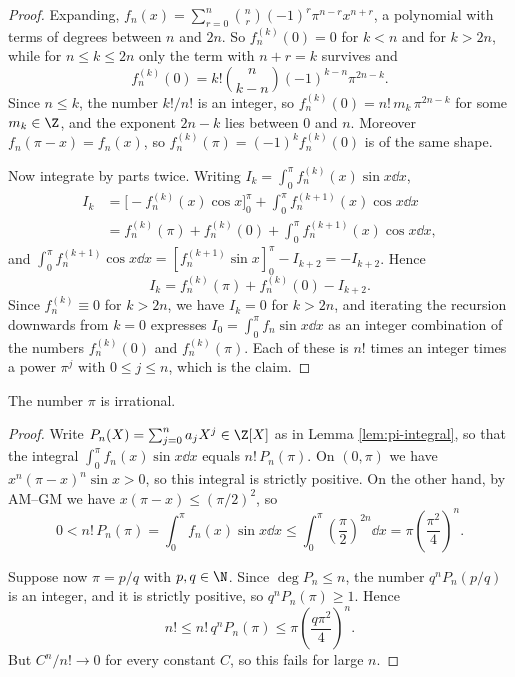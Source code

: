 \begin{proof}
	Expanding, $f_n(x) = \sum_{r=0}^n\binom{n}{r}(-1)^r\pi^{n-r}x^{n+r}$, a polynomial with terms of degrees between $n$ and $2n$. So $f_n^{(k)}(0) = 0$ for $k<n$ and for $k>2n$, while for $n\leq k\leq 2n$ only the term with $n+r = k$ survives and
	$$f_n^{(k)}(0) = k!\binom{n}{k-n}(-1)^{k-n}\pi^{2n-k}.$$
	Since $n\leq k$, the number $k!/n!$ is an integer, so $f_n^{(k)}(0) = n!\,m_k\,\pi^{2n-k}$ for some $m_k \in \Z$, and the exponent $2n-k$ lies between $0$ and $n$. Moreover $f_n(\pi-x) = f_n(x)$, so $f_n^{(k)}(\pi) = (-1)^kf_n^{(k)}(0)$ is of the same shape.

	Now integrate by parts twice. Writing $I_k = \int_0^\pi f_n^{(k)}(x)\sin x\dd x$,
	\begin{align*}
		I_k &= \Big[-f_n^{(k)}(x)\cos x\Big]_0^\pi + \int_0^\pi f_n^{(k+1)}(x)\cos x \dd x \\
		&= f_n^{(k)}(\pi)+f_n^{(k)}(0) + \int_0^\pi f_n^{(k+1)}(x)\cos x\dd x,
	\end{align*}
	and $\int_0^\pi f_n^{(k+1)}\cos x\dd x = \left[f_n^{(k+1)}\sin x\right]_0^\pi - I_{k+2} = -I_{k+2}$. Hence
	$$I_k = f_n^{(k)}(\pi)+f_n^{(k)}(0) - I_{k+2}.$$
	Since $f_n^{(k)}\equiv0$ for $k>2n$, we have $I_k = 0$ for $k>2n$, and iterating the recursion downwards from $k=0$ expresses $I_0 = \int_0^\pi f_n\sin x\dd x$ as an integer combination of the numbers $f_n^{(k)}(0)$ and $f_n^{(k)}(\pi)$. Each of these is $n!$ times an integer times a power $\pi^j$ with $0\leq j\leq n$, which is the claim.
\end{proof}

\begin{theorem}\label{thm:pi-irrational}
	The number $\pi$ is irrational.
\end{theorem}

\begin{proof}
	Write $P_n(X) = \sum_{j=0}^na_jX^j\in\Z[X]$ as in Lemma \ref{lem:pi-integral}, so that the integral $\int_0^\pi f_n(x)\sin x\dd x$ equals $n!\,P_n(\pi)$. On $(0,\pi)$ we have $x^n(\pi-x)^n\sin x > 0$, so this integral is strictly positive. On the other hand, by AM--GM we have $x(\pi-x)\leq(\pi/2)^2$, so
	$$0 < n!\,P_n(\pi) = \int_0^\pi f_n(x)\sin x\dd x \leq \int_0^\pi\left(\frac\pi2\right)^{2n}\dd x = \pi\left(\frac{\pi^2}{4}\right)^{n}.$$

	Suppose now $\pi = p/q$ with $p,q\in\N$. Since $\deg P_n\leq n$, the number $q^nP_n(p/q)$ is an integer, and it is strictly positive, so $q^nP_n(\pi)\geq1$. Hence
	$$n! \leq n!\,q^nP_n(\pi) \leq \pi\left(\frac{q\pi^2}{4}\right)^n.$$
	But $C^n/n!\to0$ for every constant $C$, so this fails for large $n$.
\end{proof}

